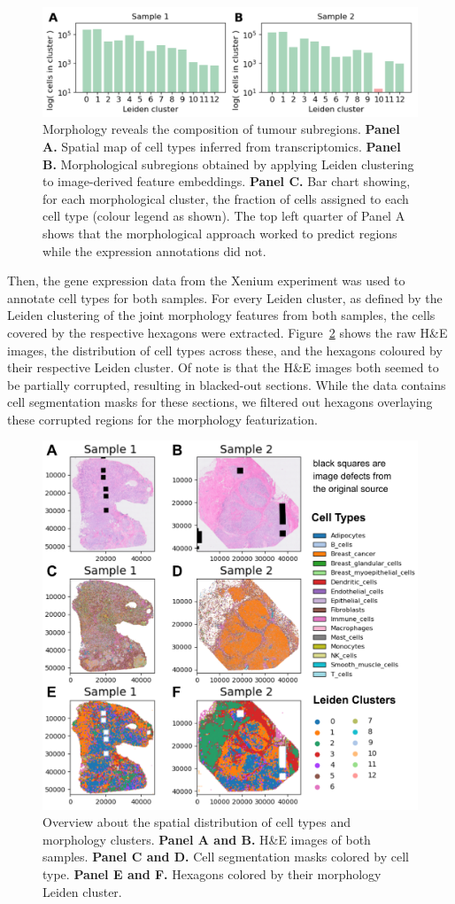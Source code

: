 \documentclass{article}
\begin{document}
\begin{figure}[htbp]
\centering
\includegraphics[width=.7\linewidth]{./figs/fig_S4_spatial_c10.png}
\caption{\label{fig:spatial_c10}{}Morphology reveals the composition of tumour subregions. \textbf{Panel A.} Spatial map of cell types inferred from transcriptomics. \textbf{Panel B.} Morphological subregions obtained by applying Leiden clustering to image-derived feature embeddings. \textbf{Panel C.} Bar chart showing, for each morphological cluster, the fraction of cells assigned to each cell type (colour legend as shown). The top left quarter of Panel A shows that the morphological approach worked to predict regions while the expression annotations did not.}
\end{figure}

\newpage

Then, the gene expression data from the Xenium experiment was used to annotate cell types for both samples. For every Leiden cluster, as defined by the Leiden clustering of the joint morphology features from both samples, the cells covered by the respective hexagons were extracted. Figure~\ref{fig:spatial_hne} shows the raw H\&E images, the distribution of cell types across these, and the hexagons coloured by their respective Leiden cluster. Of note is that the H\&E images both seemed to be partially corrupted, resulting in blacked-out sections. While the data contains cell segmentation masks for these sections, we filtered out hexagons overlaying these corrupted regions for the morphology featurization.

\begin{figure}[htbp]
\centering
\includegraphics[width=.65\linewidth]{./figs/fig_S2_spatial_hne.png}
\caption{\label{fig:spatial_hne}{}Overview about the spatial distribution of cell types and morphology clusters. \textbf{Panel A and B.} H\&E images of both samples. \textbf{Panel C and D.} Cell segmentation masks colored by cell type. \textbf{Panel E and F.} Hexagons colored by their morphology Leiden cluster.}
\end{figure}
\end{document}
